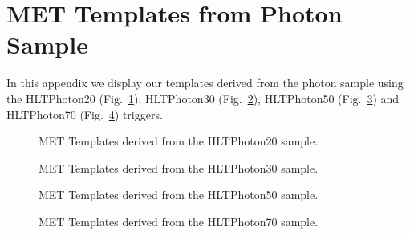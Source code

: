 \section{MET Templates from Photon Sample}
\label{sec:appendix_templates}

In this appendix we display our templates derived from the photon sample 
using the HLTPhoton20 (Fig.~\ref{fig:template20}), HLTPhoton30 (Fig.~\ref{fig:template30}),
HLTPhoton50 (Fig.~\ref{fig:template50}) and HLTPhoton70 (Fig.~\ref{fig:template70}) triggers.

\clearpage

\begin{figure}[hbt]
  \begin{center}
    \caption{MET Templates derived from the HLTPhoton20 sample.}
    \label{fig:template20}
  \end{center}
\end{figure}

\begin{figure}[hbt]
  \begin{center}
    \caption{MET Templates derived from the HLTPhoton30 sample.}
    \label{fig:template30}
  \end{center}
\end{figure}

\begin{figure}[hbt]
  \begin{center}
    \caption{MET Templates derived from the HLTPhoton50 sample.}
    \label{fig:template50}
  \end{center}
\end{figure}

\begin{figure}[hbt]
  \begin{center}
    \caption{MET Templates derived from the HLTPhoton70 sample.}
    \label{fig:template70}
  \end{center}
\end{figure}

